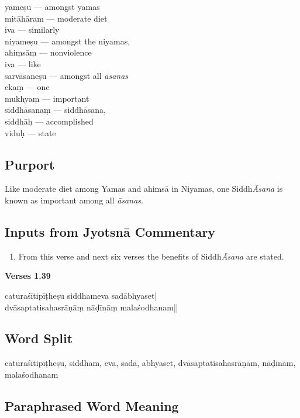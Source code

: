 \begin{multicols}{2}
yameṣu --- amongst yamas \\
mitāhāram --- moderate diet  \\ 
iva --- similarly   \\
niyameṣu ---  amongst the niyamas,  \\
ahiṃsāṃ --- nonviolence  \\
iva ---  like  \\
sarvāsaneṣu --- amongst all \textit{āsanas}   \\
ekaṃ --- one  \\
mukhyaṃ --- important  \\
siddhāsanaṃ --- siddhāsana,  \\
siddhāḥ --- accomplished   \\
viduḥ --- state
\end{multicols}

\subsection*{Purport}

Like moderate diet  among Yamas and ahimsā in Niyamas, one Siddh\textit{Āsana} is known as important among all \textit{āsanas}. 

\subsection*{Inputs from Jyotsnā Commentary}

\begin{enumerate}
\item From this verse and next six verses the benefits of Siddh\textit{Āsana} are stated.
\end{enumerate}

\newpage
\noindent \textbf{Verses 1.39}

\begin{shloka}
caturaśītipīṭheṣu siddhameva sadābhyaset|\\
dvāsaptatisahasrāṇāṃ nāḍīnāṃ malaśodhanam||
\end{shloka}

\subsection*{Word Split}

caturaśītipīṭheṣu, siddham,  eva, sadā, abhyaset, dvāsaptatisahasrāṇām, nāḍīnām, malaśodhanam

\subsection*{Paraphrased Word Meaning}


